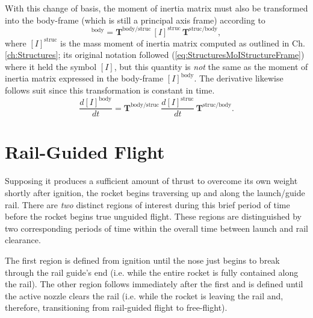 \documentclass[11pt,dvipsnames]{thesis}
\begin{document}
With this change of basis, the moment of inertia matrix must also be transformed into the body-frame (which is still a principal axis frame) according to
\begin{equation}
[I]^{\text{body}} = \mathbf{T}^{\text{body}/\text{struc}} \,[I]^\text{struc}\,\mathbf{T}^{\text{struc}/\text{body}},
\end{equation}
where $[I]^\text{struc}$ is the mass moment of inertia matrix computed as outlined in Ch. \ref{ch:Structures}; its original notation followed (\ref{eq:StructuresMoIStructureFrame}) where it held the symbol $[I]$, but this quantity is \textit{not} the same as the moment of inertia matrix expressed in the body-frame $[I]^{\text{body}}$. The derivative likewise follows suit since this transformation is constant in time.
\begin{equation}
\frac{d[I]^{\text{body}}}{dt} = \mathbf{T}^{\text{body}/\text{struc}} \,\frac{d[I]^\text{struc}}{dt}\,\mathbf{T}^{\text{struc}/\text{body}}.
\end{equation}

\section{Rail-Guided Flight}
Supposing it produces a sufficient amount of thrust to overcome its own weight shortly after ignition, the rocket begins traversing up and along the launch/guide rail. There are \textit{two} distinct regions of interest during this brief period of time before the rocket begins true unguided flight. These regions are distinguished by two corresponding periods of time within the overall time between launch and rail clearance. 

The first region is defined from ignition until the nose just begins to break through the rail guide's end (i.e. while the entire rocket is fully contained along the rail). The other region follows immediately after the first and is defined until the active nozzle clears the rail (i.e. while the rocket is leaving the rail and, therefore, transitioning from rail-guided flight to free-flight).
\end{document}
